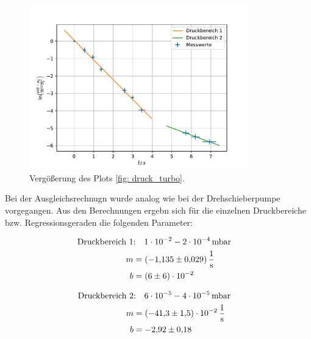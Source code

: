 \FloatBarrier
\begin{figure}[h]
  \centering
  \includegraphics[width=0.85\textwidth]{../Messdaten/plots/turbo/druckplot_turbo_zoom.pdf}
  \caption{Vergößerung des Plots \ref{fig: druck_turbo}.}
  \label{fig: druck_turbo_zoom}
\end{figure}
\FloatBarrier
Bei der Ausgleichsrechnugn wurde analog wie bei der Drehschieberpumpe vorgegangen.
Aus den Berechnungen ergebn sich für die einzelnen Druckbereiche bzw. Regressionsgeraden die
folgenden Parameter:

\begin{align}
  \label{eq: regression_turbo_druck_1}
  \begin{aligned}
  \text{Druckbereich 1} &\text{:}\quad \num{1e-2} - \num{2e-4} \, \text{mbar}& \\
  m&=\SI{-1.135\pm0.029 }{\per\second} \\
  b&=\num{ 6 \pm 6 e-2 }
\end{aligned}
\end{align}

\begin{align}
  \label{eq: regression_turbo_druck_2}
  \begin{aligned}
  \text{Druckbereich 2} &\text{:}\quad \num{6e-5} - \num{4e-05} \, \text{mbar}& \\
  m&=\SI{-41.3\pm1.5 e-2}{\per\second} \\
  b&=\num{-2.92 \pm0.18 }
\end{aligned}
\end{align}

